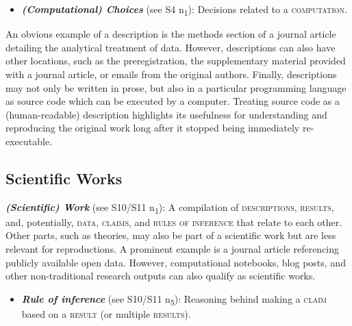 \documentclass[authordate, meta]{jote-new-article}
\begin{document}
	\begin{itemize}[label=\phantom{\textbullet},topsep=0pt]
		\item \emph{\textbf{(Computational) Choices}} (see S4 \rightarrow{ }n\textsubscript{1}): Decisions related to a \textsc{computation}.
		
	\end{itemize}

	\vspace{\topsep}
	An obvious example of a description is the methods section of a journal article detailing the analytical treatment of data. However, descriptions can also have other locations, such as the preregistration, the supplementary material provided with a journal article, or emails from the original authors. Finally, descriptions may not only be written in prose, but also in a particular programming language as source code which can be executed by a computer. Treating source code as a (human-readable) description highlights its usefulness for understanding and reproducing the original work long after it stopped being immediately re-executable.



	\subsection{Scientific Works}

	\noindent\emph{\textbf{(Scientific) Work}} (see S10/S11 \rightarrow{ }n\textsubscript{1}): A compilation of \textsc{descriptions}, \textsc{results}, and, potentially, \textsc{data}, \textsc{claims}, and \textsc{rules of inference} that relate to each other. Other parts, such as theories, may also be part of a scientific work but are less relevant for reproductions. A prominent example is a journal article referencing publicly available open data. However, computational notebooks, blog posts, and other non-traditional research outputs can also qualify as scientific works.



	\begin{itemize}[label=\phantom{\textbullet},topsep=0pt]
		\item \emph{\textbf{Rule of inference}} (see S10/S11 \rightarrow{ }n\textsubscript{5}): Reasoning behind making a \textsc{claim} based on a \textsc{result} (or multiple \textsc{results}).
		
	\end{itemize}

	
\end{document}
